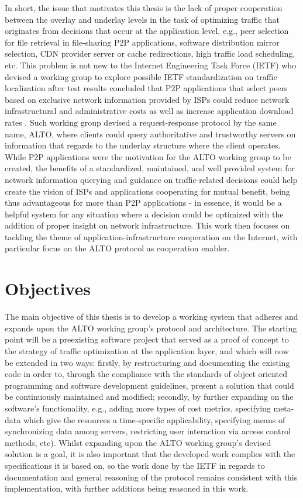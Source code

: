     In short, the issue that motivates this thesis is the lack of proper cooperation between the overlay and underlay levels in the task of optimizing traffic that originates from decisions that occur at the application level, e.g., peer selection for file retrieval in file-sharing P2P applications, software distribution mirror selection, CDN provider server or cache redirections, high traffic load scheduling, etc.
    This problem is not new to the Internet Engineering Task Force (IETF) who devised a working group to explore possible IETF standardization on traffic localization after test results concluded that P2P applications that select peers based on exclusive network information provided by ISPs could reduce network infrastructural and administrative costs as well as increase application download rates \cite{seedorf2009}.
    Such working group devised a request-response protocol by the same name, ALTO, where clients could query authoritative and trustworthy servers on information that regards to the underlay structure where the client operates.
    While P2P applications were the motivation for the ALTO working group to be created, the benefits of a standardized, maintained, and well provided system for network information querying and guidance on traffic-related decisions could help create the vision of ISPs and applications cooperating for mutual benefit, being thus advantageous for more than P2P applications - in essence, it would be a helpful system for any situation where a decision could be optimized with the addition of proper insight on network infrastructure.
    This work then focuses on tackling the theme of application-infrastructure cooperation on the Internet, with particular focus on the ALTO protocol as cooperation enabler.

\section{Objectives}

    The main objective of this thesis is to develop a working system that adheres and expands upon the ALTO working group's protocol and architecture.
    The starting point will be a preexisting software project that served as a proof of concept to the strategy of traffic optimization at the application layer, and which will now be extended in two ways: firstly, by restructuring and documenting the existing code in order to, through the compliance with the standards of object oriented programming and software development guidelines, present a solution that could be continuously maintained and modified; secondly, by further expanding on the software's functionality, e.g., adding more types of cost metrics, specifying meta-data which give the resources a time-specific applicability, specifying means of synchronizing data among servers, restricting user interaction via access control methods, etc).
    Whilst expanding upon the ALTO working group's devised solution is a goal, it is also important that the developed work complies with the specifications it is based on, so the work done by the IETF in regards to documentation and general reasoning of the protocol remains consistent with this implementation, with further additions being reasoned in this work.

